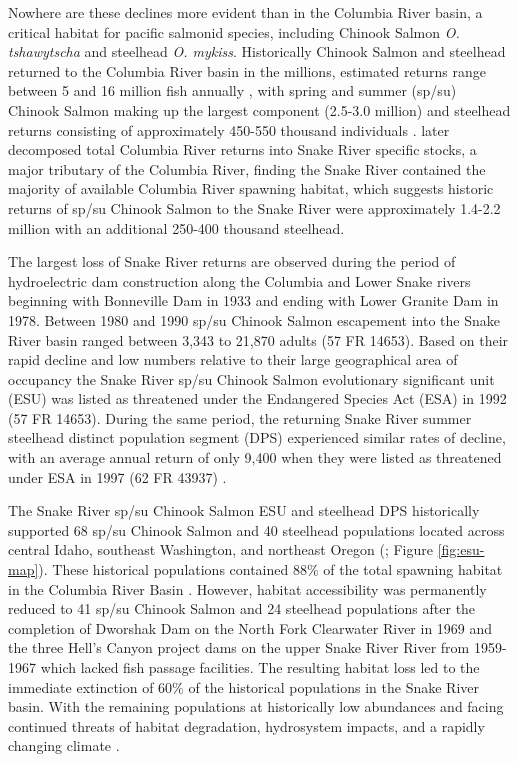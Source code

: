 \documentclass[12pt,a4paper]{article}
\begin{document}
Nowhere are these declines more evident than in the Columbia River basin, a critical habitat for pacific salmonid species, including Chinook Salmon \emph{O. tshawytscha} and steelhead \emph{O. mykiss}. Historically Chinook Salmon and steelhead returned to the Columbia River basin in the millions, estimated returns range between 5 and 16 million fish annually \autocite{chapman_salmon_1986,isab_density_2015,npcc_compilation_1986}, with spring and summer (sp/su) Chinook Salmon making up the largest component (2.5-3.0 million) and steelhead returns consisting of approximately 450-550 thousand individuals \autocite{chapman_salmon_1986}. \textcite{chapman_historical_2003} later decomposed total Columbia River returns into Snake River specific stocks, a major tributary of the Columbia River, finding the Snake River contained the majority of available Columbia River spawning habitat, which suggests historic returns of sp/su Chinook Salmon to the Snake River were approximately 1.4-2.2 million with an additional 250-400 thousand steelhead.

The largest loss of Snake River returns are observed during the period of hydroelectric dam construction along the Columbia and Lower Snake rivers beginning with Bonneville Dam in 1933 and ending with Lower Granite Dam in 1978. Between 1980 and 1990 sp/su Chinook Salmon escapement into the Snake River basin ranged between 3,343 to 21,870 adults (57 FR 14653)\autocite{noauthor_federal_1992}. Based on their rapid decline and low numbers relative to their large geographical area of occupancy the Snake River sp/su Chinook Salmon evolutionary significant unit (ESU) was listed as threatened under the Endangered Species Act (ESA) in 1992 (57 FR 14653)\autocite{noauthor_federal_1992}. During the same period, the returning Snake River summer steelhead distinct population segment (DPS) experienced similar rates of decline, with an average annual return of only 9,400 when they were listed as threatened under ESA in 1997 (62 FR 43937) \autocite{noauthor_federal_1997}.

The Snake River sp/su Chinook Salmon ESU and steelhead DPS historically supported 68 sp/su Chinook Salmon and 40 steelhead populations located across central Idaho, southeast Washington, and northeast Oregon (\autocite{cbp_vision_2020}; Figure \ref{fig:esu-map}). These historical populations contained 88\% of the total spawning habitat in the Columbia River Basin \autocite{chapman_historical_2003}. However, habitat accessibility was permanently reduced to 41 sp/su Chinook Salmon and 24 steelhead populations after the completion of Dworshak Dam on the North Fork Clearwater River in 1969 and the three Hell's Canyon project dams on the upper Snake River River from 1959-1967 which lacked fish passage facilities. The resulting habitat loss led to the immediate extinction of 60\% of the historical populations in the Snake River basin. With the remaining populations at historically low abundances and facing continued threats of habitat degradation, hydrosystem impacts, and a rapidly changing climate \autocite{noaa_rebuilding_2022,crozier_climate_2021,nakamura_divergent_2023}.
\end{document}
